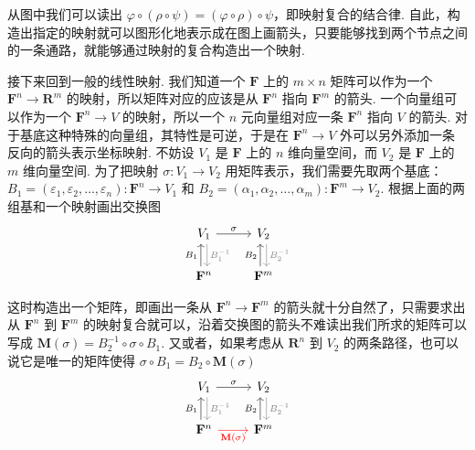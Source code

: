 从图中我们可以读出 $\varphi\circ(\rho\circ\psi) = (\varphi\circ\rho)\circ\psi$，即映射复合的结合律. 自此，构造出指定的映射就可以图形化地表示成在图上画箭头，只要能够找到两个节点之间的一条通路，就能够通过映射的复合构造出一个映射.

接下来回到一般的线性映射. 我们知道一个 $\mathbf{F}$ 上的 $m\times n$ 矩阵可以作为一个 $\mathbf{F}^n\to\mathbf{R}^m$ 的映射，所以矩阵对应的应该是从 $\mathbf{F}^n$ 指向 $\mathbf{F}^m$ 的箭头. 一个向量组可以作为一个 $\mathbf{F}^n\to V$ 的映射，所以一个 $n$ 元向量组对应一条 $\mathbf{F}^n$ 指向 $V$ 的箭头. 对于基底这种特殊的向量组，其特性是可逆，于是在 $\mathbf{F}^n\to V$ 外可以另外添加一条反向的箭头表示坐标映射. 不妨设 $V_1$ 是 $\mathbf{F}$ 上的 $n$ 维向量空间，而 $V_2$ 是 $\mathbf{F}$ 上的 $m$ 维向量空间. 为了把映射 $\sigma\colon V_1\to V_2$ 用矩阵表示，我们需要先取两个基底：$B_1 = (\varepsilon_1, \varepsilon_2, \ldots, \varepsilon_n)\colon \mathbf{F}^n\to V_1$ 和 $B_2 = (\alpha_1, \alpha_2, \ldots, \alpha_m)\colon\mathbf{F}^m\to V_2$. 根据上面的两组基和一个映射画出交换图
{
\[
\begin{tikzcd}
V_1 \arrow[r, "\sigma"]
\arrow[d, gray, shift left, "B_1^{-1}"] &
V_2 \arrow[d, gray, shift left, "B_2^{-1}"] \\
\mathbf{F}^n \arrow[u, shift left, "B_1"] &
\mathbf{F}^m \arrow[u, shift left, "B_2"]
\end{tikzcd}
\]
}

这时构造出一个矩阵，即画出一条从 $\mathbf{F}^n\to\mathbf{F}^m$ 的箭头就十分自然了，只需要求出从 $\mathbf{F}^n$ 到 $\mathbf{F}^m$ 的映射复合就可以，沿着交换图的箭头不难读出我们所求的矩阵可以写成 $\mathbf{M}(\sigma) = B_2^{-1} \circ \sigma \circ B_1$. 又或者，如果考虑从 $\mathbf{R}^n$ 到 $V_2$ 的两条路径，也可以说它是唯一的矩阵使得 $\sigma \circ B_1 = B_2 \circ \mathbf{M}(\sigma)$
{
\[
\begin{tikzcd}
V_1 \arrow[r, "\sigma"]
\arrow[d, gray, shift left, "B_1^{-1}"] &
V_2 \arrow[d, gray, shift left, "B_2^{-1}"] \\
\mathbf{F}^n \arrow[u, shift left, "B_1"]
\arrow[r, red, "\mathbf{M}(\sigma)"'] &
\mathbf{F}^m \arrow[u, shift left, "B_2"]
\end{tikzcd}
\]
}


